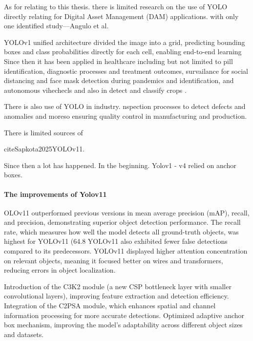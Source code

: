 \documentclass[a4paper,10pt,twocolumn]{article}
\numberwithin{figure}{section}
\numberwithin{table}{section}
\begin{document}
 As for relating to this thesis. there is limited research on the use of YOLO 
directly relating for Digital Asset Management (DAM) applications. with only one identified 
study—Angulo et al. 








 
 
 
 
 YOLOv1 unified architecture divided the image into a grid, predicting bounding boxes and
 class probabilities directly for each cell, enabling end-to-end learning
Since then it has been applied in healthcare including but not limited to pill identification, diagnostic processes and treatment outcomes, 
survailance for social distancing and face mask detection during pandemics and identification, and 
autonomous vihechecls and also in detect and classify crops \cite{Sapkota2025YOLOv11}. 

There is also use of YOLO in industry. nspection processes to detect defects and anomalies
and moreso ensuring quality control in manufacturing and production.

There is limited sources of 

cite{Sapkota2025YOLOv11}. 



Since then a lot has happened. In the beginning. Yolov1 - v4 relied on anchor boxes. 

\paragraph{The improvements of Yolov11}


OLOv11 outperformed previous versions in mean average precision (mAP), recall, and precision, demonstrating superior object detection performance.
The recall rate, which measures how well the model detects all ground-truth objects, was highest for YOLOv11 (64.8%
YOLOv11 also exhibited fewer false detections compared to its predecessors.
YOLOv11 displayed higher attention concentration on relevant objects, meaning it focused better on wires and transformers, reducing errors in object localization.

Introduction of the C3K2 module (a new CSP bottleneck layer with smaller convolutional layers), improving feature extraction and detection efficiency.
Integration of the C2PSA module, which enhances spatial and channel information processing for more accurate detections.
Optimized adaptive anchor box mechanism, improving the model's adaptability across different object sizes and datasets.
\end{document}

